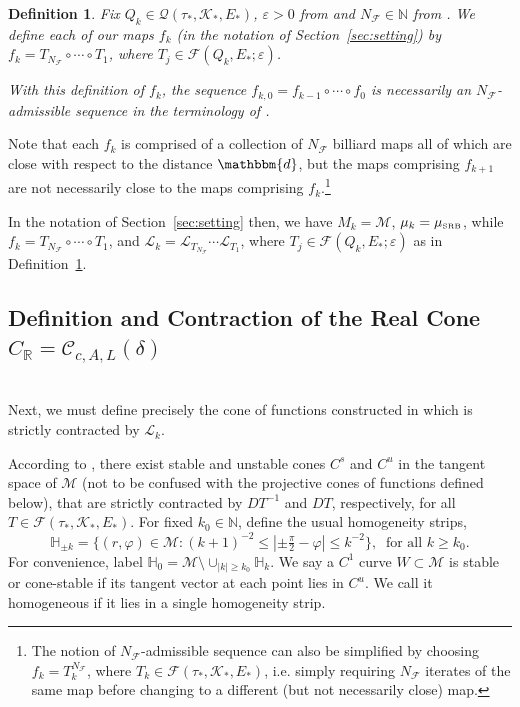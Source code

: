 \documentclass{amsart}
\numberwithin{equation}{section}
\newtheorem{defin}[thm]{Definition}
\newcommand\cC{{\mathcal C}}
\newcommand\cF{{\mathcal F}}
\newcommand\cK{{\mathcal K}}
\newcommand\cL{{\mathcal L}}
\newcommand\cM{{\mathcal M}}
\newcommand\cQ{{\mathcal Q}}
\newcommand\bR{{\mathbb R}}
\newcommand\ve{\varepsilon}
\newcommand\vf{\varphi}
\newcommand{\musrb}{\mu_{\mbox{\tiny SRB}}}
\begin{document}
\begin{defin}
\label{def:admissible}
Fix $Q_k \in \cQ(\tau_*, \cK_*, E_*)$, $\ve>0$ from \cite[Lemma~6.6(b)]{DL22} and $N_{\cF} \in \mathbb{N}$
from \cite[Theorem~2.3]{DL22}.
We define each of our maps $f_k$ (in the notation of Section~\ref{sec:setting}) by
$f_k = T_{N_\cF} \circ \cdots \circ T_1$, where $T_j \in \cF(Q_k, E_*; \ve)$.

With this definition of $f_k$, the sequence $f_{k,0} = f_{k-1} \circ \cdots \circ f_0$ is necessarily an
{\em $N_{\cF}$-admissible sequence} in the terminology of \cite[Definition~2.4]{DL22}.  
\end{defin}

Note that each
$f_k$ is comprised of a collection of $N_\cF$ billiard maps all of which are close with respect to the
distance $\mathbbm{d}$, but the maps comprising $f_{k+1}$ are not necessarily close to the maps
comprising $f_k$.\footnote{The notion of $N_{\cF}$-admissible sequence can also be simplified by choosing $f_k = T_k^{N_{\cF}}$,
where $T_k \in \cF(\tau_*, \cK_*, E_*)$, i.e. simply requiring $N_{\cF}$ iterates of the same map before changing
to a different (but not necessarily close) map.}

In the notation of Section~\ref{sec:setting} then, we have $M_k = \cM$, $\mu_k = \musrb$, while 
$f_k = T_{N_\cF} \circ \cdots \circ T_1$, and $\cL_k = \cL_{T_{N_\cF}} \cdots \cL_{T_1}$, where $T_j \in \cF(Q_k, E_*; \ve)$
as in Definition~\ref{def:admissible}.  


\subsection{Definition and Contraction of the Real Cone $C_{\bR} = \cC_{c,A,L}(\delta)$}\ \\
\label{sec:cone def}
Next, we must define precisely the cone of functions
constructed in \cite{DL22} which is strictly contracted by $\cL_k$.

According to \cite[Section~3.1]{DL22}, there exist stable and unstable cones $C^s$ and $C^u$ 
in the tangent space of $\cM$
(not to be confused with the projective cones of functions defined below), that are strictly contracted by
$DT^{-1}$ and $DT$, respectively, for all $T \in \cF(\tau_*, \cK_*, E_*)$.  
For fixed $k_0 \in \mathbb{N}$, define the usual homogeneity strips,
\[
\mathbb{H}_{\pm k} = \{ (r,\vf) \in \cM : (k+1)^{-2} \le | \pm \tfrac{\pi}{2} - \vf | \le k^{-2} \} , \; \; \mbox{for all $k \ge k_0$.}
\]
For convenience, label $\mathbb{H}_0 = \cM \setminus \cup_{|k| \ge k_0} \mathbb{H}_k$.
We say a $C^1$ curve $W \subset \cM$ is stable or cone-stable if its tangent vector at each point lies in $C^u$.  We call it 
homogeneous if it lies in a single homogeneity strip. 
\end{document}
